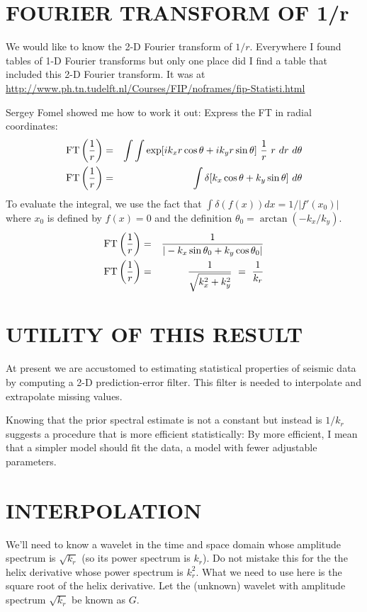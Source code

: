 \section{FOURIER TRANSFORM OF 1/r}
We would like to know the 2-D Fourier transform
of $1/r$.
Everywhere I found tables of 1-D Fourier transforms but only
one place did I find a table that included this 2-D Fourier transform.
It was at
        \url{http://www.ph.tn.tudelft.nl/Courses/FIP/noframes/fip-Statisti.html}
\par
Sergey Fomel showed me how to work it out:
Express the FT in radial coordinates:
\def\FT{{\rm FT}\left({1\over r}\right)}
\begin{eqnarray}
\FT &=& \int \int \exp[i k_x r \cos\theta + i k_y r \sin\theta]\
        {1\over r}\ r \ dr \ d\theta   \\
\FT &=& \int \delta[k_x \cos\theta + k_y \sin\theta]\ d\theta
\end{eqnarray}
        To evaluate the integral, we use the fact that
        $\int\delta(f(x))dx = 1/|f'(x_0)|$ where $x_0$ is defined by $f(x)=0$
        and the definition
        $ \theta_0 =\arctan (-k_x/k_y)$.
\begin{eqnarray}
\FT &=&
{1\over |-k_x \sin\theta_0 + k_y \cos\theta_0|}
\\
\FT &=&
{1\over\sqrt{k_x^2 + k_y^2}} \ =\  {1\over k_r} 
\end{eqnarray}





\section{UTILITY OF THIS RESULT}
At present we are accustomed to estimating
statistical properties of seismic data
by computing a 2-D prediction-error filter.
This filter is needed to interpolate and extrapolate missing values.

\par
Knowing that the prior spectral estimate is not a constant
but instead is $1/k_r$ suggests a procedure
that is
more efficient
statistically:
By more efficient,
I mean that a simpler model should fit the data,
a model with fewer adjustable parameters.

\section{INTERPOLATION}
\par
We'll need to know a wavelet in the time and space domain
whose amplitude spectrum is
$\sqrt{k_r}$
(so its power spectrum is $k_r$).
Do not mistake this for the the helix derivative \cite[]{geofizhelix}
whose power spectrum is $k_r^2$.
What we need to use here is the square root of the helix derivative.
Let the (unknown) wavelet with 
amplitude spectrum
$\sqrt{k_r}$
be known as $G$.


